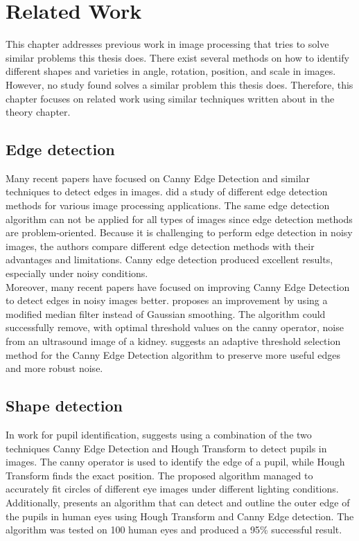 \chapter{Related Work}
\label{cha:related work}
This chapter addresses previous work in image processing that tries to solve similar problems this thesis does. There exist several methods on how to identify different shapes and varieties in angle, rotation, position, and scale in images. However, no study found solves a similar problem this thesis does. Therefore, this chapter focuses on related work using similar techniques written about in the theory chapter. 

\section{Edge detection}
Many recent papers have focused on Canny Edge Detection and similar techniques to detect edges in images. \cite{Genesan} did a study of different edge detection methods for various image processing applications. The same edge detection algorithm can not be applied for all types of images since edge detection methods are problem-oriented. Because it is challenging to perform edge detection in noisy images, the authors compare different edge detection methods with their advantages and limitations. Canny edge detection produced excellent results, especially under noisy conditions.\\

\noindent Moreover, many recent papers have focused on improving Canny Edge Detection to detect edges in noisy images better. \cite{Nikolic} proposes an improvement by using a modified median filter instead of Gaussian smoothing. The algorithm could successfully remove, with optimal threshold values on the canny operator, noise from an ultrasound image of a kidney. \cite{Rong} suggests an adaptive threshold selection method for the Canny Edge Detection algorithm to preserve more useful edges and more robust noise.

\section{Shape detection}
In work for pupil identification, \cite{Soltany} suggests using a combination of the two techniques Canny Edge Detection and Hough Transform to detect pupils in images. The canny operator is used to identify the edge of a pupil, while Hough Transform finds the exact position. The proposed algorithm managed to accurately fit circles of different eye images under different lighting conditions. Additionally, \cite{Divya} presents an algorithm that can detect and outline the outer edge of the pupils in human eyes using Hough Transform and Canny Edge detection. The algorithm was tested on 100 human eyes and produced a 95\%  successful result.\\

